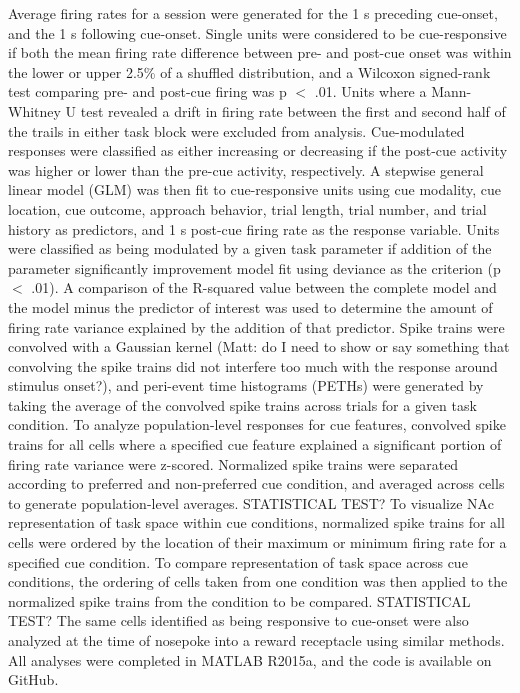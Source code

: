 \documentclass[11pt]{article}
\begin{document}
Average firing rates for a session were generated for the 1 s preceding cue-onset, and the 1 s following cue-onset. Single units were considered to be cue-responsive if both the mean firing rate difference between pre- and post-cue onset was within the lower or upper 2.5\% of a shuffled distribution, and a Wilcoxon signed-rank test comparing pre- and post-cue firing was p $<$ .01. Units where a Mann-Whitney U test revealed a drift in firing rate between the first and second half of the trails in either task block were excluded from analysis. Cue-modulated responses were classified as either increasing or decreasing if the post-cue activity was higher or lower than the pre-cue activity, respectively. A stepwise general linear model (GLM) was then fit to cue-responsive units using cue modality, cue location, cue outcome, approach behavior, trial length, trial number, and trial history as predictors, and 1 s post-cue firing rate as the response variable. Units were classified as being modulated by a given task parameter if addition of the parameter significantly improvement model fit using deviance as the criterion (p $<$ .01). A comparison of the R-squared value between the complete model and the model minus the predictor of interest was used to determine the amount of firing rate variance explained by the addition of that predictor. Spike trains were convolved with a Gaussian kernel (Matt: do I need to show or say something that convolving the spike trains did not interfere too much with the response around stimulus onset?), and peri-event time histograms (PETHs) were generated by taking the average of the convolved spike trains across trials for a given task condition. To analyze population-level responses for cue features, convolved spike trains for all cells where a specified cue feature explained a significant portion of firing rate variance were z-scored. Normalized spike trains were separated according to preferred and non-preferred cue condition, and averaged across cells to generate population-level averages. STATISTICAL TEST? To visualize NAc representation of task space within cue conditions, normalized spike trains for all cells were ordered by the location of their maximum or minimum firing rate for a specified cue condition. To compare representation of task space across cue conditions, the ordering of cells taken from one condition was then applied to the normalized spike trains from the condition to be compared. STATISTICAL TEST? The same cells identified as being responsive to cue-onset were also analyzed at the time of nosepoke into a reward receptacle using similar methods. All analyses were completed in MATLAB R2015a, and the code is available on GitHub.
\end{document}
